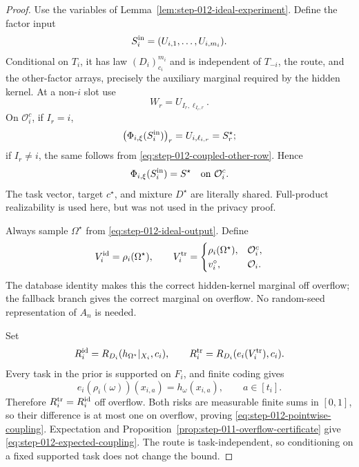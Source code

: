 \begin{proof}
Use the variables of Lemma~\ref{lem:step-012-ideal-experiment}.  Define
the factor input
\begin{equation}\label{eq:step-012-coupled-factor-input}
S_i^{\rm in}=(U_{i,1},\ldots,U_{i,m_i}).
\end{equation}
Conditional on \(T_i\), it has law \((D_i)_{c_i}^{m_i}\) and is independent
of \(T_{-i}\), the route, and the other-factor arrays, precisely the
auxiliary marginal required by the hidden kernel.  At a non-\(i\) slot use
\begin{equation}\label{eq:step-012-coupled-other-row}
W_r=U_{I_r,\ell_{I_r,r}}.
\end{equation}
On \(\mathcal O_i^c\), if \(I_r=i\),
\begin{equation}\label{eq:step-012-i-slot-identity}
\bigl(\Phi_{i,\xi}(S_i^{\rm in})\bigr)_r
=U_{i,\ell_{i,r}}=S_r^\star;
\end{equation}
if \(I_r\ne i\), the same follows from
\eqref{eq:step-012-coupled-other-row}.  Hence
\begin{equation}\label{eq:step-012-database-identity}
\Phi_{i,\xi}(S_i^{\rm in})=S^\star
\quad\text{on }\mathcal O_i^c.
\end{equation}
The task vector, target \(c^\star\), and mixture \(D^\star\) are literally
shared.  Full-product realizability is used here, but was not used in the
privacy proof.

Always sample \(\Omega^\star\) from
\eqref{eq:step-012-ideal-output}.  Define
\begin{equation}\label{eq:step-012-coupled-output-vectors}
V_i^{\rm id}=\rho_i(\Omega^\star),
\qquad
V_i^{\rm tr}=
\begin{cases}
\rho_i(\Omega^\star),&\mathcal O_i^c,\\
v_i^\circ,&\mathcal O_i.
\end{cases}
\end{equation}
The database identity makes this the correct hidden-kernel marginal off
overflow; the fallback branch gives the correct marginal on overflow.  No
random-seed representation of \(A_n\) is needed.

Set
\begin{equation}\label{eq:step-012-coupled-risks}
R_i^{\rm id}=R_{D_i}(h_{\Omega^\star}|_{X_i},c_i),
\qquad
R_i^{\rm tr}=R_{D_i}(e_i(V_i^{\rm tr}),c_i).
\end{equation}
Every task in the prior is supported on \(F_i\), and finite coding gives
\begin{equation}\label{eq:step-012-evaluation-identity}
e_i(\rho_i(\omega))(x_{i,a})=h_\omega(x_{i,a}),
\qquad a\in[t_i].
\end{equation}
Therefore \(R_i^{\rm tr}=R_i^{\rm id}\) off overflow.  Both risks are
measurable finite sums in \([0,1]\), so their difference is at most one on
overflow, proving \eqref{eq:step-012-pointwise-coupling}.  Expectation and
Proposition~\ref{prop:step-011-overflow-certificate} give
\eqref{eq:step-012-expected-coupling}.  The route is task-independent, so
conditioning on a fixed supported task does not change the bound.
\end{proof}

